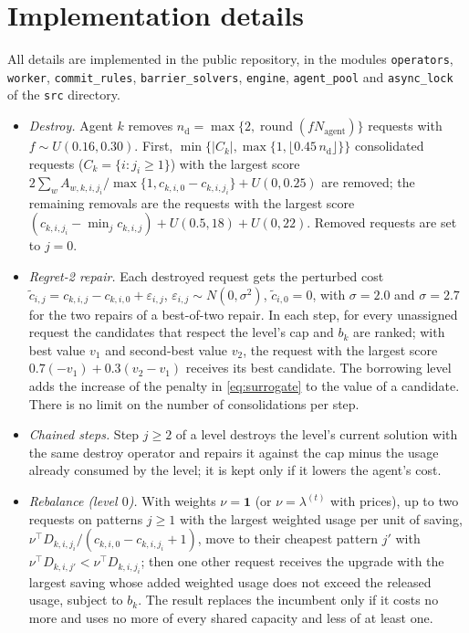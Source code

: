 \documentclass[a4paper,fleqn]{cas-sc}
\begin{document}
\section{Implementation details}
\label{app:details}
All details are implemented in the public repository, in the modules \texttt{operators}, \texttt{worker}, \texttt{commit\_rules}, \texttt{barrier\_solvers}, \texttt{engine}, \texttt{agent\_pool} and \texttt{async\_lock} of the \texttt{src} directory.
\begin{itemize}[noitemsep]
    \item \textit{Destroy.} Agent $k$ removes $n_{\text{d}} = \max\{2, \operatorname{round}(f N_{\text{agent}})\}$ requests with $f \sim U(0.16, 0.30)$. First, $\min\{|C_k|, \max\{1, \lfloor 0.45\, n_{\text{d}} \rfloor\}\}$ consolidated requests ($C_k = \{i : j_i \ge 1\}$) with the largest score $2\sum_w A_{w,k,i,j_i} / \max\{1, c_{k,i,0} - c_{k,i,j_i}\} + U(0, 0.25)$ are removed; the remaining removals are the requests with the largest score $(c_{k,i,j_i} - \min_j c_{k,i,j}) + U(0.5, 18) + U(0, 22)$. Removed requests are set to $j = 0$.
    \item \textit{Regret-2 repair.} Each destroyed request gets the perturbed cost $\tilde{c}_{i,j} = c_{k,i,j} - c_{k,i,0} + \varepsilon_{i,j}$, $\varepsilon_{i,j} \sim N(0, \sigma^2)$, $\tilde{c}_{i,0} = 0$, with $\sigma = 2.0$ and $\sigma = 2.7$ for the two repairs of a best-of-two repair. In each step, for every unassigned request the candidates that respect the level's cap and $b_k$ are ranked; with best value $v_1$ and second-best value $v_2$, the request with the largest score $0.7(-v_1) + 0.3(v_2 - v_1)$ receives its best candidate. The borrowing level adds the increase of the penalty in \eqref{eq:surrogate} to the value of a candidate. There is no limit on the number of consolidations per step.
    \item \textit{Chained steps.} Step $j \ge 2$ of a level destroys the level's current solution with the same destroy operator and repairs it against the cap minus the usage already consumed by the level; it is kept only if it lowers the agent's cost.
    \item \textit{Rebalance (level $0$).} With weights $\nu = \mathbf{1}$ (or $\nu = \lambda^{(t)}$ with prices), up to two requests on patterns $j \ge 1$ with the largest weighted usage per unit of saving, $\nu^\top D_{k,i,j_i} / (c_{k,i,0} - c_{k,i,j_i} + 1)$, move to their cheapest pattern $j'$ with $\nu^\top D_{k,i,j'} < \nu^\top D_{k,i,j_i}$; then one other request receives the upgrade with the largest saving whose added weighted usage does not exceed the released usage, subject to $b_k$. The result replaces the incumbent only if it costs no more and uses no more of every shared capacity and less of at least one.

\end{itemize}
\end{document}

